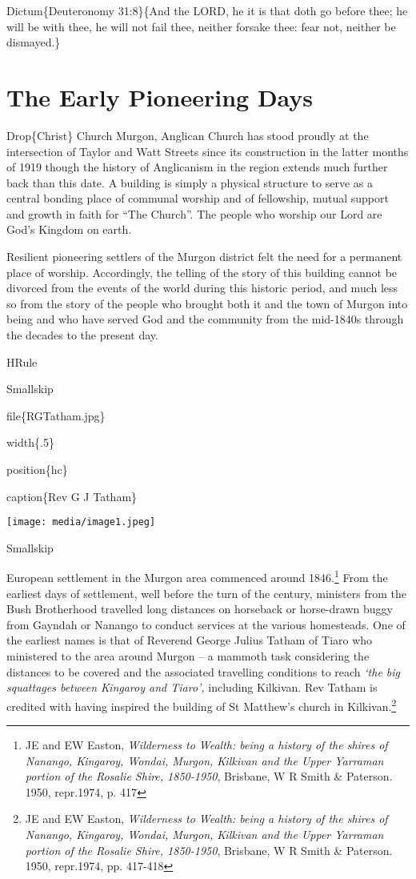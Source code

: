 Dictum\{Deuteronomy 31:8\}\{And the LORD, he it is that doth go before thee; he will be with thee, he will not fail thee, neither forsake thee: fear not, neither be dismayed.\}

\hypertarget{the-early-pioneering-days}{%
\chapter{The Early Pioneering Days}\label{the-early-pioneering-days}}

Drop\{Christ\} Church Murgon, Anglican Church has stood proudly at the intersection of Taylor and Watt Streets since its construction in the latter months of 1919 though the history of Anglicanism in the region extends much further back than this date. A building is simply a physical structure to serve as a central bonding place of communal worship and of fellowship, mutual support and growth in faith for ``The Church''. The people who worship our Lord are God's Kingdom on earth.

Resilient pioneering settlers of the Murgon district felt the need for a permanent place of worship. Accordingly, the telling of the story of this building cannot be divorced from the events of the world during this historic period, and much less so from the story of the people who brought both it and the town of Murgon into being and who have served God and the community from the mid-1840s through the decades to the present day.

HRule

Smallskip

file\{RGTatham.jpg\}

width\{.5\}

position\{hc\}

caption\{Rev G J Tatham\}

\texttt{[image: media/image1.jpeg]}

Smallskip

European settlement in the Murgon area commenced around 1846.\footnote{JE and EW Easton, \emph{Wilderness to Wealth: being a history of the shires of Nanango, Kingaroy, Wondai, Murgon, Kilkivan and the Upper Yarraman portion of the Rosalie Shire, 1850-1950}, Brisbane, W R Smith \& Paterson. 1950, repr.1974, p. 417} From the earliest days of settlement, well before the turn of the century, ministers from the Bush Brotherhood travelled long distances on horseback or horse-drawn buggy from Gayndah or Nanango to conduct services at the various homesteads. One of the earliest names is that of Reverend George Julius Tatham of Tiaro who ministered to the area around Murgon -- a mammoth task considering the distances to be covered and the associated travelling conditions to reach \emph{`the big squattages between Kingaroy and Tiaro',} including Kilkivan. Rev Tatham is credited with having inspired the building of St Matthew's church in Kilkivan.\footnote{JE and EW Easton, \emph{Wilderness to Wealth: being a history of the shires of Nanango, Kingaroy, Wondai, Murgon, Kilkivan and the Upper Yarraman portion of the Rosalie Shire, 1850-1950}, Brisbane, W R Smith \& Paterson. 1950, repr.1974, pp. 417-418}

